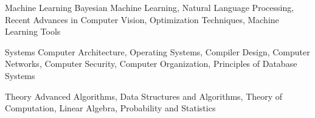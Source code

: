 

\begin{cvskills}

  \cvskill
    {Machine Learning} %
    {
    	Bayesian Machine Learning, Natural Language Processing, Recent Advances in Computer Vision, Optimization Techniques, Machine Learning Tools
    } %

  \cvskill
    {Systems} %
    {
    	Computer Architecture, Operating Systems, Compiler Design, Computer Networks,
    	Computer Security, Computer Organization, Principles of Database Systems
    } %

  \cvskill
    {Theory} %
    {Advanced Algorithms, Data Structures and Algorithms, Theory of Computation, Linear Algebra, Probability and Statistics} %
	

\end{cvskills}
